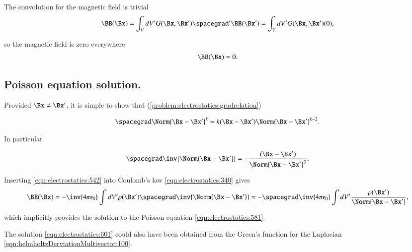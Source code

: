 The convolution for the magnetic field is trivial
\begin{dmath}\label{eqn:electrostatics:641}
\BB(\Bx)
= \int_V dV' G(\Bx, \Bx') \spacegrad' \BB(\Bx')
= \int_V dV' G(\Bx, \Bx') (0),
\end{dmath}

so the magnetic field is zero everywhere
\begin{dmath}\label{eqn:electrostatics:320}
\BB(\Bx) = 0.
\end{dmath}


\subsection{Poisson equation solution.}

Provided \( \Bx \ne \Bx' \), it is simple to show that (\cref{problem:electrostatics:gradrelation})

\begin{dmath}\label{eqn:electrostatics:541}
\spacegrad \Norm{\Bx - \Bx'}^k = k (\Bx - \Bx') \Norm{ \Bx - \Bx' }^{k-2}.
\end{dmath}

In particular

\begin{dmath}\label{eqn:electrostatics:542}
\spacegrad \inv{\Norm{\Bx - \Bx'}} = - \frac{(\Bx - \Bx')}{\Norm{ \Bx - \Bx' }^{3}}.
\end{dmath}

Inserting \cref{eqn:electrostatics:542} into Coulomb's law \cref{eqn:electrostatics:340} gives
\begin{dmath}\label{eqn:electrostatics:661}
\BE(\Bx)
=
-\inv{4 \pi \epsilon_0} \int dV' \rho(\Bx') \spacegrad \inv{\Norm{\Bx - \Bx'}}
=
- \spacegrad \inv{4 \pi \epsilon_0} \int dV' \frac{\rho(\Bx')}{\Norm{\Bx - \Bx'}},
\end{dmath}

which implicitly provides the solution to the Poisson equation \cref{eqn:electrostatics:581}


The solution \cref{eqn:electrostatics:601} could also have been obtained from the Green's function for the Laplacian
\cref{eqn:helmholtzDerviationMultivector:100}.
